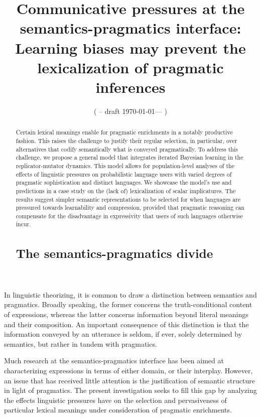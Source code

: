 \documentclass[a4paper]{article}
\title{Communicative pressures at the semantics-pragmatics interface:\\ Learning biases may prevent the lexicalization of pragmatic inferences}
\author{%
    ( -- draft \today --- )
}
\date{}
\begin{document}
\maketitle

\begin{abstract} Certain lexical meanings enable for pragmatic enrichments in a notably productive fashion. This raises the challenge to justify their regular selection, in particular, over alternatives that codify semantically what is conveyed pragmatically. To address this challenge, we propose a general model that integrates iterated Bayesian learning in the replicator-mutator dynamics. This model allows for population-level analyses of the effects of linguistic pressures on probabilistic language users with varied degrees of pragmatic sophistication and distinct languages. We showcase the model's use and predictions in a case study on the (lack of) lexicalization of scalar implicatures. The results suggest simpler semantic representations to be selected for when languages are pressured towards learnability and compression, provided that pragmatic reasoning can compensate for the disadvantage in expressivity that users of such languages otherwise incur.


\section{The semantics-pragmatics divide}\label{sec:introduction}

\end{abstract}

In linguistic theorizing, it is common to draw a distinction between semantics and pragmatics. Broadly speaking, the former concerns the truth-conditional content of expressions, whereas the latter concerns information beyond literal meanings and their composition. An important consequence of this distinction is that the information conveyed by an utterance is seldom, if ever, solely determined by semantics, but rather in tandem with pragmatics. 

Much research at the semantics-pragmatics interface has been aimed at characterizing expressions in terms of either domain, or their interplay. However, an issue that has received little attention is the justification of semantic structure in light of pragmatics. The present investigation seeks to fill this gap by analyzing the effects linguistic pressures have on the selection and pervasiveness of particular lexical meanings under consideration of pragmatic enrichments.
\end{document}
